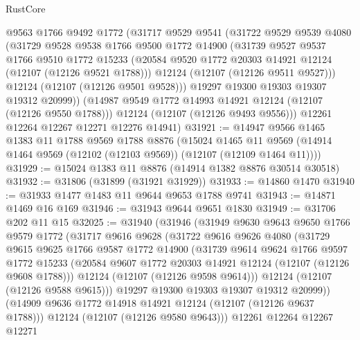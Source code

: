 \begin{lexlean}{RustCore}
\begin{coremodule}
        @9563
        @1766
        @9492
        @1772
        (@31717
          @9529
          @9541
          (@31722
            @9529
            @9539
            @4080
            (@31729
              @9528
              @9538
              @1766
              @9500
              @1772
              @14900
              (@31739
                @9527
                @9537
                @1766
                @9510
                @1772
                @15233
                (@20584 @9520 @1772 @20303 @14921 @12124 (@12107 (@12126 @9521 @1788)))
                @12124
                (@12107 (@12126 @9511 @9527)))
              @12124
              (@12107 (@12126 @9501 @9528)))
            @19297
            @19300
            @19303
            @19307
            @19312
            @20999))
        (@14987 @9549 @1772 @14993 @14921 @12124 (@12107 (@12126 @9550 @1788)))
        @12124
        (@12107 (@12126 @9493 @9556)))
      @12261
      @12264
      @12267
      @12271
      @12276
      @14941)
@31921 := @14947
    @9566
    @1465
    @1383
    @11
    @1788
    @9569
    @1788
    @8876
    (@15024
      @1465
      @11
      @9569
      (@14914 @1464 @9569 (@12102 (@12103 @9569)) (@12107 (@12109 @1464 @11))))
@31929 := @15024 @1383 @11 @8876 (@14914 @1382 @8876 @30514 @30518)
@31932 := @31806 (@31899 (@31921 @31929))
@31933 := @14860 @1470
@31940 := @31933 @1477 @1483 @11 @9644 @9653 @1788 @9741
@31943 := @14871 @1469 @16 @169
@31946 := @31943 @9644 @9651 @1830
@31949 := @31706 @202 @11 @15
@32025 := @31940
    (@31946
      (@31949
        @9630
        @9643
        @9650
        @1766
        @9579
        @1772
        (@31717
          @9616
          @9628
          (@31722
            @9616
            @9626
            @4080
            (@31729
              @9615
              @9625
              @1766
              @9587
              @1772
              @14900
              (@31739
                @9614
                @9624
                @1766
                @9597
                @1772
                @15233
                (@20584 @9607 @1772 @20303 @14921 @12124 (@12107 (@12126 @9608 @1788)))
                @12124
                (@12107 (@12126 @9598 @9614)))
              @12124
              (@12107 (@12126 @9588 @9615)))
            @19297
            @19300
            @19303
            @19307
            @19312
            @20999))
        (@14909 @9636 @1772 @14918 @14921 @12124 (@12107 (@12126 @9637 @1788)))
        @12124
        (@12107 (@12126 @9580 @9643)))
      @12261
      @12264
      @12267
      @12271

\end{coremodule}
\end{lexlean}
